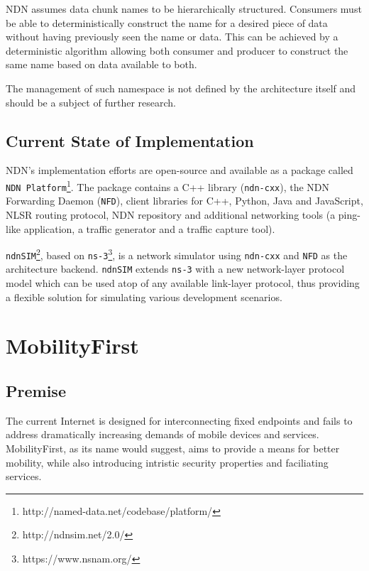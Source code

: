                 NDN assumes data chunk names to be hierarchically structured. Consumers must be able to deterministically construct the name for a desired piece of data without having previously seen the name or data. This can be achieved by a deterministic algorithm allowing both consumer and producer to construct the same name based on data available to both.

                The management of such namespace is not defined by the architecture itself and should be a subject of further research.

        \subsection{Current State of Implementation}

            NDN's implementation efforts are open-source and available as a package called \texttt{NDN Platform}\footnote{http://named-data.net/codebase/platform/}. The package contains a C++ library (\texttt{ndn-cxx}), the NDN Forwarding Daemon (\texttt{NFD}), client libraries for C++, Python, Java and JavaScript, NLSR routing protocol, NDN repository and additional networking tools (a ping-like application, a traffic generator and a traffic capture tool).

            \texttt{ndnSIM}\footnote{http://ndnsim.net/2.0/}, based on \texttt{ns-3}\footnote{https://www.nsnam.org/}, is a network simulator using \texttt{ndn-cxx} and \texttt{NFD} as the architecture backend. \texttt{ndnSIM} extends \texttt{ns-3} with a new network-layer protocol model which can be used atop of any available link-layer protocol, thus providing a flexible solution for simulating various development scenarios.


    \section{MobilityFirst}\label{archs:mf}

        \subsection{Premise}

            The current Internet is designed for interconnecting fixed endpoints and fails to address dramatically increasing demands of mobile devices and services. MobilityFirst, as its name would suggest, aims to provide a means for better mobility, while also introducing intristic security properties and faciliating services.

